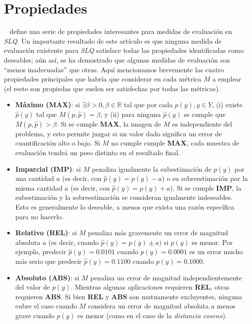 \section{Propiedades}\label{evaluacion:propiedades}

~\citet{sebastiani2020evaluation} define una serie de propiedades interesantes
para medidas de evaluación en {\it SLQ}. Un importante resultado de este
artículo es que ninguna medida de evaluación existente para {\it SLQ\/}
satisface todas las propiedades identificadas como deseables; aún así, se ha
demostrado que algunas medidas de evaluación son “menos inadecuadas” que otras.
Aquí mencionamos brevemente las cuatro propiedades principales que habría que
considerar en cada métrica $M$ a emplear (el resto son propiedas que suelen ser
satisfechas por todas las métricas).

\begin{itemize}
    \item {\bf Máximo (MAX)}: si $\exists \beta >0, \beta \in  \mathbb{R}$ tal
    que por cada $p(y), y \in Y$, (i) existe $\hat p(y)$ tal que $M(p, \hat p) =
    \beta$, y (ii) para ninguna $\hat p(y)$ se cumple que $M(p, \hat p) >
    \beta$. Si se cumple {\bf MAX}, la imagen de $M$ es independiente del
    problema, y esto permite juzgar si un valor dado significa un error de
    cuantificación alto o bajo. Si $M$ no cumple cumple {\bf MAX}, cada muestra
    de evaluación tendrá un peso distinto en el resultado final.
    \item {\bf Imparcial (IMP)}: si $M$ penaliza igualmente la subestimación de
    $p(y)$ por una cantidad $a$ (es decir, con $\hat p(y) = p(y) - a$) o su
    sobreestimación por la misma cantidad $a$ (es decir, con $\hat p(y) = p(y) +
    a$). Si se cumple {\bf IMP}, la subestimación y la sobreestimación se
    consideran igualmente indeseables. Esto es generalmente lo deseable, a menos
    que exista una razón específica para no hacerlo.
    \item {\bf Relativo (REL)}: si $M$ penaliza más gravemente un error de
    magnitud absoluta $a$ (es decir, cuando $\hat p(y) = p(y) \pm a)$ si $p(y)$
    es menor. Por ejemplo, predecir $\hat p(y) = 0.0101$ cuando $p(y) = 0.0001$
    es un error mucho más serio que predecir $\hat p(y) = 0.1100$ cuando $p(y) =
    0.1000$.
    \item {\bf Absoluto (ABS)}: si $M$ penaliza un error de magnitud
    independientemente del valor de $p(y)$. Mientras algunas aplicaciones
    requieren {\bf REL}, otras requieren {\bf ABS}. Si bien {\bf REL} y {\bf
    ABS} son mutuamente excluyentes, ninguna cubre el caso cuando $M$ considera
    un error de magnitud absoluta $a$ menos grave cuando $p(y)$ es menor (como
    en el caso de la {\it distancia coseno\/}).
\end{itemize}

